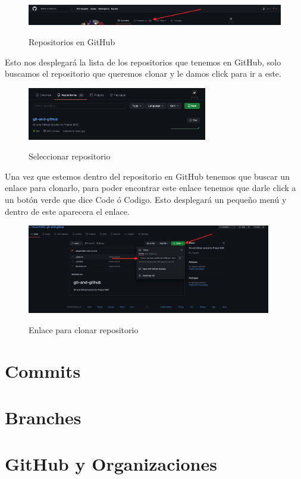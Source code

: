 \documentclass[11pt, oneside]{article}
\begin{document}
\begin{figure}[H]
  \centering
  \caption{Repositorios en GitHub}
  \includegraphics[width=\textwidth]{./img/github-new-repo-6.png}
  \label{fig:github-new-repo-6}
\end{figure}

Esto nos desplegará la lista de los repositorios que tenemos en GitHub, solo buscamos el repositorio que queremos clonar y le damos click para ir a este.

\begin{figure}[H]
  \centering
  \caption{Seleccionar repositorio}
  \includegraphics[width=0.70\textwidth]{./img/github-new-repo-7.png}
  \label{fig:github-new-repo-7}
\end{figure}

Una vez que estemos dentro del repositorio en GitHub tenemos que buscar un enlace para clonarlo, para poder encontrar este enlace tenemos que darle click a un botón verde que dice Code ó Codigo. Esto desplegará un pequeño menú y dentro de este aparecera el enlace.

\begin{figure}[H]
  \centering
  \caption{Enlace para clonar repositorio}
  \includegraphics[width=0.95\textwidth]{./img/github-new-repo-8.png}
  \label{fig:github-new-repo-8}
\end{figure}

\section{Commits}

\section{Branches}

\section{GitHub y Organizaciones}
\end{document}
